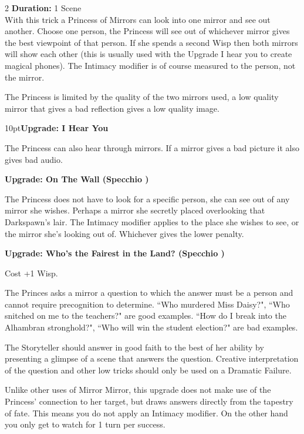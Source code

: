 \begin{multicols}{2}
\noindent \textbf{Duration:} 1 Scene\\

\noindent With this trick a Princess of Mirrors can look into one mirror and see out another. Choose one person, the Princess will see out of whichever mirror gives the best viewpoint of that person. If she spends a second Wisp then both mirrors will show each other (this is usually used with the Upgrade I hear you to create magical phones). The Intimacy modifier is of course measured to the person, not the mirror. 

The Princess is limited by the quality of the two mirrors used, a low quality mirror that gives a bad reflection gives a low quality image.

\begin{myindentpar}{10pt}\textbf{Upgrade: I Hear You}

The Princess can also hear through mirrors. If a mirror gives a bad picture it also gives bad audio.

\textbf{Upgrade: On The Wall (Specchio \textbullet\textbullet\textbullet)}

The Princess does not have to look for a specific person, she can see out of any mirror she wishes. Perhaps a mirror she secretly placed overlooking that Darkspawn's lair. The Intimacy modifier applies to the place she wishes to see, or the mirror she's looking out of. Whichever gives the lower penalty.

\textbf{Upgrade: Who's the Fairest in the Land? (Specchio \textbullet\textbullet\textbullet\textbullet\textbullet)}

Cost +1 Wisp.

The Princes asks a mirror a question to which the answer must be a person and cannot require precognition to determine. \textquotedblleft Who murdered Miss Daisy?", \textquotedblleft Who snitched on me to the teachers?" are good examples. \textquotedblleft How do I break into the Alhambran stronghold?", \textquotedblleft Who will win the student election?" are bad examples.

The Storyteller should answer in good faith to the best of her ability by presenting a glimpse of a scene that answers the question. Creative interpretation of the question and other low tricks should only be used on a Dramatic Failure.

Unlike other uses of Mirror Mirror, this upgrade does not make use of the Princess' connection to her target, but draws answers directly from the tapestry of fate. This means you do not apply an Intimacy modifier. On the other hand you only get to watch for 1 turn per success. 


\end{myindentpar}
\end{multicols}
